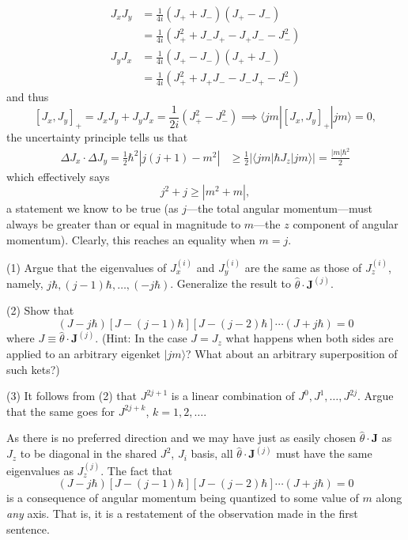 \documentclass[../principles-of-quantum-mechanics.tex]{subfiles}
\begin{document}
\begin{questions}
\begin{solution}
\begin{align*}
				J_xJ_y &= \frac{1}{4i}(J_+ + J_-)(J_+ - J_-) \\
				&= \frac{1}{4i}(J_+^2 + J_-J_+ - J_+J_- - J_-^2) \\
				J_yJ_x &= \frac{1}{4i}(J_+ - J_-)(J_+ + J_-) \\
				&= \frac{1}{4i}(J_+^2 + J_+J_- - J_-J_+ - J_-^2)
			\end{align*}
			and thus
			$$[J_x, J_y]_+ = J_xJ_y + J_yJ_x = \frac{1}{2i}(J_+^2 - J_-^2) \implies \langle jm|[J_x, J_y]_+|jm\rangle = 0,$$
			the uncertainty principle tells us that
			\begin{align*}
				\Delta J_x\cdot\Delta J_y = \frac{1}{2}\hbar^2|j(j + 1) - m^2| &\geq \frac{1}{2}|\langle jm|\hbar J_z|jm\rangle| = \frac{|m|\hbar^2}{2}
			\end{align*}
			which effectively says
			$$j^2 + j \geq |m^2 + m|,$$
			a statement we know to be true (as $j$---the total angular momentum---must always be greater than or equal in magnitude to $m$---the $z$ component of angular momentum). Clearly, this reaches an equality when $m = j$.
		\end{solution}
	
		\question (1) Argue that the eigenvalues of $J_x^{(i)}$ and $J_y^{(i)}$ are the same as those of $J_z^{(i)}$, namely, $j\hbar, (j - 1)\hbar, \dots, (-j\hbar)$. Generalize the result to $\hat{\theta}\cdot\mathbf{J}^{(j)}$.
		
		(2) Show that
		$$(J - j\hbar)[J - (j-1)\hbar][J - (j - 2)\hbar]\cdots(J + j\hbar) = 0$$
		where $J \equiv \hat{\theta}\cdot\mathbf{J}^{(j)}$. (Hint: In the case $J = J_z$ what happens when both sides are applied to an arbitrary eigenket $|jm\rangle$? What about an arbitrary superposition of such kets?)
		
		(3) It follows from (2) that $J^{2j + 1}$ is a linear combination of $J^0, J^1, \dots, J^{2j}$. Argue that the same goes for $J^{2j + k}$, $k = 1, 2, \dots$.
		
		\begin{solution}
			As there is no preferred direction and we may have just as easily chosen $\hat{\theta}\cdot\mathbf{J}$ as $J_z$ to be diagonal in the shared $J^2$, $J_i$ basis, all $\hat{\theta}\cdot\mathbf{J}^{(j)}$ must have the same eigenvalues as $J_z^{(j)}$. The fact that
			$$(J - j\hbar)[J - (j-1)\hbar][J - (j - 2)\hbar]\cdots(J + j\hbar) = 0$$
			is a consequence of angular momentum being quantized to some value of $m$ along \textit{any} axis. That is, it is a restatement of the observation made in the first sentence.
			

\end{solution}
\end{questions}
\end{document}
